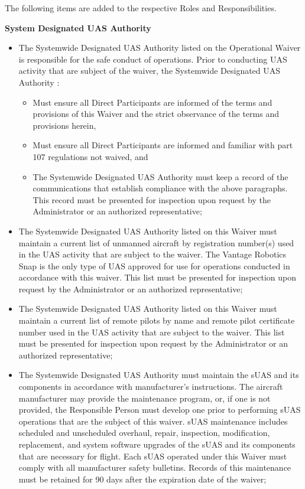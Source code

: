 \documentclass[
]{book}
\providecommand{\tightlist}{%
  \setlength{\itemsep}{0pt}\setlength{\parskip}{0pt}}
\begin{document}
The following items are added to the respective Roles and Responsibilities.

\textbf{System Designated UAS Authority}

\begin{itemize}
\item
  The Systemwide Designated UAS Authority listed on the Operational Waiver is responsible for the safe conduct of operations. Prior to conducting UAS activity that are subject of the waiver, the Systemwide Designated UAS Authority :

  \begin{itemize}
  \tightlist
  \item
    Must ensure all Direct Participants are informed of the terms and provisions of this Waiver and the strict observance of the terms and provisions herein,
  \item
    Must ensure all Direct Participants are informed and familiar with part 107 regulations not waived, and
  \item
    The Systemwide Designated UAS Authority must keep a record of the communications that establish compliance with the above paragraphs. This record must be presented for inspection upon request by the Administrator or an authorized representative;
  \end{itemize}
\item
  The Systemwide Designated UAS Authority listed on this Waiver must maintain a current list of unmanned aircraft by registration number(s) used in the UAS activity that are subject to the waiver. The Vantage Robotics Snap is the only type of UAS approved for use for operations conducted in accordance with this waiver. This list must be presented for inspection upon request by the Administrator or an authorized representative;
\item
  The Systemwide Designated UAS Authority listed on this Waiver must maintain a current list of remote pilots by name and remote pilot certificate number used in the UAS activity that are subject to the waiver. This list must be presented for inspection upon request by the Administrator or an authorized representative;
\item
  The Systemwide Designated UAS Authority must maintain the sUAS and its components in accordance with manufacturer's instructions. The aircraft manufacturer may provide the maintenance program, or, if one is not provided, the Responsible Person must develop one prior to performing sUAS operations that are the subject of this waiver. sUAS maintenance includes scheduled and unscheduled overhaul, repair, inspection, modification, replacement, and system software upgrades of the sUAS and its components that are necessary for flight. Each sUAS operated under this Waiver must comply with all manufacturer safety bulletins. Records of this maintenance must be retained for 90 days after the expiration date of the waiver;

\end{itemize}
\end{document}
